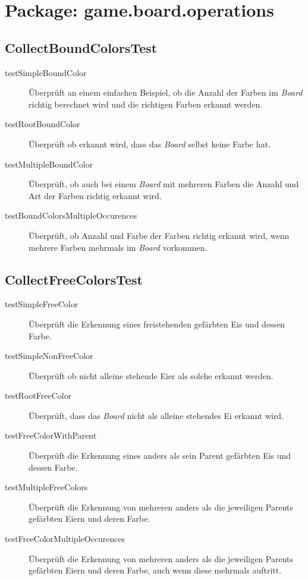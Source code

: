 \section{Package: game.board.operations}
\subsection{CollectBoundColorsTest}
	\begin{description}
		\item[testSimpleBoundColor] Überprüft an einem einfachen Beispiel, ob die Anzahl der Farben im \emph{Board} richtig
			berechnet wird und die richtigen Farben erkannt werden.
		\item[testRootBoundColor] Überprüft ob erkannt wird, dass das \emph{Board} selbst keine Farbe hat. 
		\item[testMultipleBoundColor] Überprüft, ob auch bei einem \emph{Board} mit mehreren Farben die Anzahl und Art der 
			Farben richtig erkannt wird.
		\item[testBoundColorsMultipleOccurences]Überprüft, ob Anzahl und Farbe der Farben richtig erkannt wird, wenn mehrere 
			Farben mehrmals im \emph{Board} vorkommen. 
	\end{description}

\subsection{CollectFreeColorsTest}
	\begin{description}
		\item[testSimpleFreeColor] Überprüft die Erkennung eines freistehenden gefärbten Eis und dessen Farbe.
		\item[testSimpleNonFreeColor] Überprüft ob nicht alleine stehende Eier als solche erkannt werden.
		\item[testRootFreeColor]Überprüft, dass das \emph{Board} nicht als alleine stehendes Ei erkannt wird.
		\item[testFreeColorWithParent] Überprüft die Erkennung eines anders als sein Parent gefärbten Eis und dessen Farbe.
		\item[testMultipleFreeColors] Überprüft die Erkennung von mehreren anders als die jeweiligen Parents gefärbten Eiern 
			und deren Farbe.
		\item[testFreeColorMultipleOccurences]Überprüft die Erkennung von mehreren anders als die jeweiligen Parents gefärbten 
			Eiern und deren Farbe, auch wenn diese mehrmals auftritt.
	\end{description}

